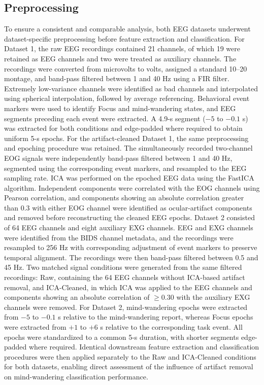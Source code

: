 \documentclass[conference]{IEEEtran}
\begin{document}
\subsection{Preprocessing}
To ensure a consistent and comparable analysis, both EEG datasets underwent dataset-specific preprocessing before feature extraction and classification. For Dataset 1, the raw EEG recordings contained 21 channels, of which 19 were retained as EEG channels and two were treated as auxiliary channels. The recordings were converted from microvolts to volts, assigned a standard 10--20 montage, and band-pass filtered between 1 and 40 Hz using a FIR filter. Extremely low-variance channels were identified as bad channels and interpolated using spherical interpolation, followed by average referencing. Behavioral event markers were used to identify Focus and mind-wandering states, and EEG segments preceding each event were extracted. A 4.9-s segment ($-5$ to $-0.1$ s) was extracted for both conditions and edge-padded where required to obtain uniform 5-s epochs.
For the artifact-cleaned Dataset 1, the same preprocessing and epoching procedure was retained. The simultaneously recorded two-channel EOG signals were independently band-pass filtered between 1 and 40 Hz, segmented using the corresponding event markers, and resampled to the EEG sampling rate. ICA was performed on the epoched EEG data using the FastICA algorithm. Independent components were correlated with the EOG channels using Pearson correlation, and components showing an absolute correlation greater than 0.3 with either EOG channel were identified as ocular-artifact components and removed before reconstructing the cleaned EEG epochs.
Dataset 2 consisted of 64 EEG channels and eight auxiliary EXG channels. EEG and EXG channels were identified from the BIDS channel metadata, and the recordings were resampled to 256 Hz with corresponding adjustment of event markers to preserve temporal alignment. The recordings were then band-pass filtered between 0.5 and 45 Hz. Two matched signal conditions were generated from the same filtered recordings: Raw, containing the 64 EEG channels without ICA-based artifact removal, and ICA-Cleaned, in which ICA was applied to the EEG channels and components showing an absolute correlation of $\geq 0.30$ with the auxiliary EXG channels were removed.
For Dataset 2, mind-wandering epochs were extracted from $-5$ to $-0.1$ s relative to the mind-wandering report, whereas Focus epochs were extracted from $+1$ to $+6$ s relative to the corresponding task event. All epochs were standardized to a common 5-s duration, with shorter segments edge-padded where required. Identical downstream feature extraction and classification procedures were then applied separately to the Raw and ICA-Cleaned conditions for both datasets, enabling direct assessment of the influence of artifact removal on mind-wandering classification performance.
\end{document}
